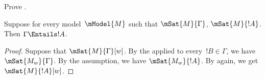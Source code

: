 \documentclass[../../../include/open-logic-section]{subfiles}
\begin{document}
\begin{prob}
  Prove . 
\end{prob}

\begin{prop}
  Suppose for every model~$\mModel{M}$ such that $\mSat{M}{\Gamma}$,
  $\mSat{M}{!A}$. Then $\Gamma \Entails !A$.
\end{prop}

\begin{proof}
  Suppose that $\mSat{M}{\Gamma}[w]$. By the 
  applied to every~$!B \in \Gamma$, we have $\mSat{M_w}{\Gamma}$. By
  the assumption, we have $\mSat{M_w}{!A}$. By 
  again, we get $\mSat{M}{!A}[w]$.
\end{proof}
\end{document}
